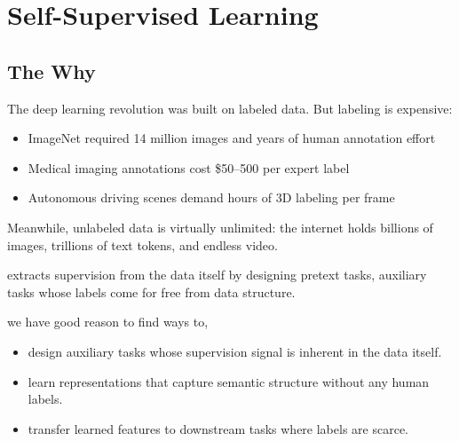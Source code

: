
\chapter{Self-Supervised Learning}


\section{The Why}


The deep learning revolution was built on labeled data. But labeling is expensive:
\begin{itemize}
    \item ImageNet required 14 million images and years of human annotation effort
    \item Medical imaging annotations cost \$50--500 per expert label
    \item Autonomous driving scenes demand hours of 3D labeling per frame
\end{itemize}

Meanwhile, unlabeled data is virtually unlimited: the internet holds billions of images, trillions of text tokens, and endless video.

 extracts supervision from the data itself by designing pretext tasks, auxiliary tasks whose labels come for free from data structure.

 we have good reason to find ways to,
\begin{itemize}
    \item design auxiliary tasks whose supervision signal is inherent in the data itself.
    \item learn representations that capture semantic structure without any human labels.
    \item transfer learned features to downstream tasks where labels are scarce.
\end{itemize}

